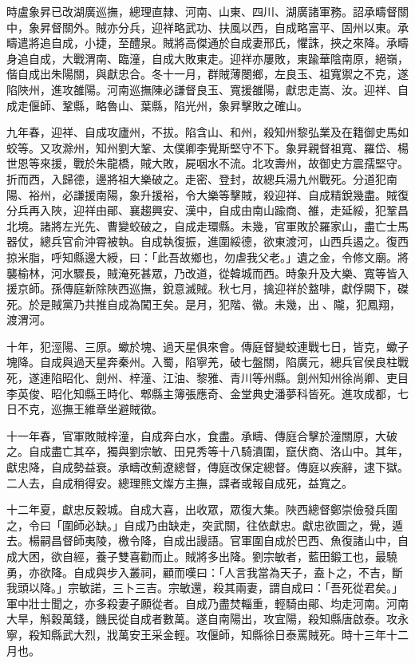 \begin{pinyinscope}
時盧象昇已改湖廣巡撫，總理直隸、河南、山東、四川、湖廣諸軍務。詔承疇督關中，象昇督關外。賊亦分兵，迎祥略武功、扶風以西，自成略富平、固州以東。承疇遣將追自成，小捷，至醴泉。賊將高傑通於自成妻邢氏，懼誅，挾之來降。承疇身追自成，大戰渭南、臨潼，自成大敗東走。迎祥亦屢敗，東踰華陰南原，絕嶺，偕自成出朱陽關，與獻忠合。冬十一月，群賊薄閿鄉，左良玉、祖寬禦之不克，遂陷陜州，進攻雒陽。河南巡撫陳必謙督良玉、寬援雒陽，獻忠走嵩、汝。迎祥、自成走偃師、鞏縣，略魯山、葉縣，陷光州，象昇擊敗之確山。

九年春，迎祥、自成攻廬州，不拔。陷含山、和州，殺知州黎弘業及在籍御史馬如蛟等。又攻滁州，知州劉大鞏、太僕卿李覺斯堅守不下。象昇親督祖寬、羅岱、楊世恩等來援，戰於朱龍橋，賊大敗，屍咽水不流。北攻壽州，故御史方震孺堅守。折而西，入歸德，邊將祖大樂破之。走密、登封，故總兵湯九州戰死。分道犯南陽、裕州，必謙援南陽，象升援裕，令大樂等擊賊，殺迎祥、自成精銳幾盡。賊復分兵再入陜，迎祥由鄖、襄趨興安、漢中，自成由南山踰商、雒，走延綏，犯鞏昌北境。諸將左光先、曹變蛟破之，自成走環縣。未幾，官軍敗於羅家山，盡亡士馬器仗，總兵官俞沖霄被執。自成執復振，進圍綏德，欲東渡河，山西兵遏之。復西掠米脂，呼知縣邊大綬，曰：「此吾故鄉也，勿虐我父老。」遺之金，令修文廟。將襲榆林，河水驟長，賊淹死甚眾，乃改道，從韓城而西。時象升及大樂、寬等皆入援京師。孫傳庭新除陜西巡撫，銳意滅賊。秋七月，擒迎祥於盩啡，獻俘闕下，磔死。於是賊黨乃共推自成為闖王矣。是月，犯階、徽。未幾，出、隴，犯鳳翔，渡渭河。

十年，犯涇陽、三原。蠍於塊、過天星俱來會。傳庭督變蛟連戰七日，皆克，蠍子塊降。自成與過天星奔秦州。入蜀，陷寧羌，破七盤關，陷廣元，總兵官侯良柱戰死，遂連陷昭化、劍州、梓潼、江油、黎雅、青川等州縣。劍州知州徐尚卿、吏目李英俊、昭化知縣王時化、郫縣主簿張應奇、金堂典史潘夢科皆死。進攻成都，七日不克，巡撫王維章坐避賊徵。

十一年春，官軍敗賊梓潼，自成奔白水，食盡。承疇、傳庭合擊於潼關原，大破之。自成盡亡其卒，獨與劉宗敏、田見秀等十八騎潰圍，竄伏商、洛山中。其年，獻忠降，自成勢益衰。承疇改薊遼總督，傳庭改保定總督。傳庭以疾辭，逮下獄。二人去，自成稍得安。總理熊文燦方主撫，諜者或報自成死，益寬之。

十二年夏，獻忠反穀城。自成大喜，出收眾，眾復大集。陜西總督鄭崇儉發兵圍之，令曰「圍師必缺。」自成乃由缺走，突武關，往依獻忠。獻忠欲圖之，覺，遁去。楊嗣昌督師夷陵，檄令降，自成出謾語。官軍圍自成於巴西、魚復諸山中，自成大困，欲自經，養子雙喜勸而止。賊將多出降。劉宗敏者，藍田鍛工也，最驍勇，亦欲降。自成與步入叢祠，顧而嘆曰：「人言我當為天子，盍卜之，不吉，斷我頭以降。」宗敏諾，三卜三吉。宗敏還，殺其兩妻，謂自成曰：「吾死從君矣。」軍中壯士聞之，亦多殺妻子願從者。自成乃盡焚輜重，輕騎由鄖、均走河南。河南大旱，斛穀萬錢，饑民從自成者數萬。遂自南陽出，攻宜陽，殺知縣唐啟泰。攻永寧，殺知縣武大烈，戕萬安王采金輕。攻偃師，知縣徐日泰罵賊死。時十三年十二月也。


\end{pinyinscope}
